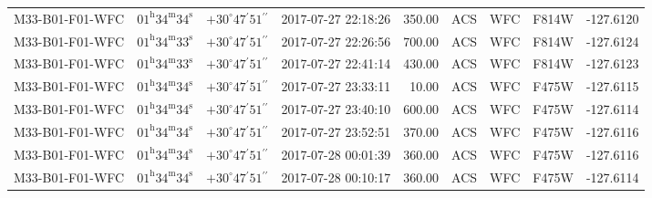 \begin{tabular}{llllrlllr}
  M33-B01-F01-WFC &  $01^\mathrm{h}34^\mathrm{m}34^\mathrm{s}$ &  $+30^\circ47{}^\prime51{}^{\prime\prime}$ &  2017-07-27 22:18:26 &  350.00 &      ACS &          WFC &  F814W & -127.6120 \\
  M33-B01-F01-WFC &  $01^\mathrm{h}34^\mathrm{m}33^\mathrm{s}$ &  $+30^\circ47{}^\prime51{}^{\prime\prime}$ &  2017-07-27 22:26:56 &  700.00 &      ACS &          WFC &  F814W & -127.6124 \\
  M33-B01-F01-WFC &  $01^\mathrm{h}34^\mathrm{m}33^\mathrm{s}$ &  $+30^\circ47{}^\prime51{}^{\prime\prime}$ &  2017-07-27 22:41:14 &  430.00 &      ACS &          WFC &  F814W & -127.6123 \\
  M33-B01-F01-WFC &  $01^\mathrm{h}34^\mathrm{m}34^\mathrm{s}$ &  $+30^\circ47{}^\prime51{}^{\prime\prime}$ &  2017-07-27 23:33:11 &   10.00 &      ACS &          WFC &  F475W & -127.6115 \\
  M33-B01-F01-WFC &  $01^\mathrm{h}34^\mathrm{m}34^\mathrm{s}$ &  $+30^\circ47{}^\prime51{}^{\prime\prime}$ &  2017-07-27 23:40:10 &  600.00 &      ACS &          WFC &  F475W & -127.6114 \\
  M33-B01-F01-WFC &  $01^\mathrm{h}34^\mathrm{m}34^\mathrm{s}$ &  $+30^\circ47{}^\prime51{}^{\prime\prime}$ &  2017-07-27 23:52:51 &  370.00 &      ACS &          WFC &  F475W & -127.6116 \\
  M33-B01-F01-WFC &  $01^\mathrm{h}34^\mathrm{m}34^\mathrm{s}$ &  $+30^\circ47{}^\prime51{}^{\prime\prime}$ &  2017-07-28 00:01:39 &  360.00 &      ACS &          WFC &  F475W & -127.6116 \\
  M33-B01-F01-WFC &  $01^\mathrm{h}34^\mathrm{m}34^\mathrm{s}$ &  $+30^\circ47{}^\prime51{}^{\prime\prime}$ &  2017-07-28 00:10:17 &  360.00 &      ACS &          WFC &  F475W & -127.6114 \\
\bottomrule
\end{tabular}
